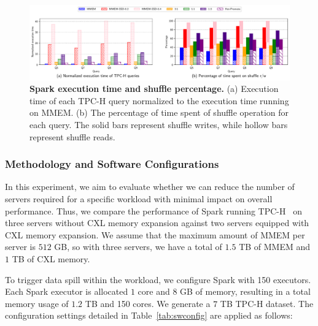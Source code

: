 \begin{figure}[t]
\centering
\includegraphics[width=1\textwidth]{fig/cxl/spark_cxl.pdf}
  \caption[Spark execution time and shuffle percentage]{\textbf{Spark execution time and shuffle percentage.} (a) Execution time of each TPC-H query normalized to the execution time running on MMEM. (b) The percentage of time spent of shuffle operation for each query. The solid bars represent shuffle writes, while hollow bars represent shuffle reads.}
\label{fig:eval_spark_1}
\end{figure}

\subsubsection{Methodology and Software Configurations}

In this experiment, we aim to evaluate whether we can reduce the number of servers required for a specific workload with minimal impact on overall performance. Thus, we compare the performance of Spark running TPC-H~\cite{tpch} on three servers without CXL memory expansion against two servers equipped with CXL memory expansion. We assume that the maximum amount of MMEM per server is $512$ GB, so with three servers, we have a total of $1.5$ TB of MMEM and $1$ TB of CXL memory.

To trigger data spill within the workload, we configure Spark with 150 executors. Each Spark executor is allocated $1$ core and $8$ GB of memory, resulting in a total memory usage of $1.2$ TB and 150 cores. We generate a $7$ TB TPC-H dataset. The configuration settings detailed in Table~\ref{tab:swconfig} are applied as follows:

